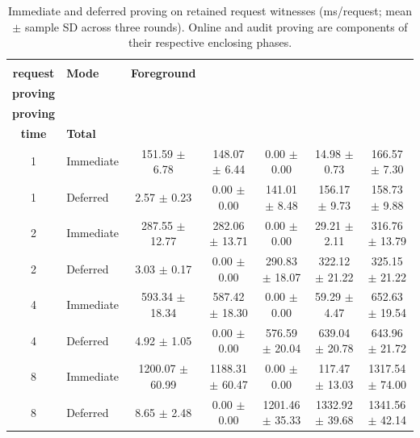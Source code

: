 \begin{table}[!t]
\centering
\caption{Immediate and deferred proving on retained request witnesses (ms/request; mean $\pm$ sample SD across three rounds). Online and audit proving are components of their respective enclosing phases.}
\label{tab:c2-deferred-cost}
\footnotesize
\renewcommand{\arraystretch}{1.08}
\begin{tabular*}{\textwidth}{@{\hspace{3pt}}c@{\extracolsep{\fill}}lccccc@{\hspace{3pt}}}
\toprule
\shortstack{\textbf{Calls/}\\\textbf{request}} & \textbf{Mode} & \textbf{Foreground} & \shortstack{\textbf{Online}\\\textbf{proving}} & \shortstack{\textbf{Audit}\\\textbf{proving}} & \shortstack{\textbf{Audit}\\\textbf{time}} & \textbf{Total} \\
\midrule
1 & Immediate & 151.59 $\pm$ 6.78 & 148.07 $\pm$ 6.44 & 0.00 $\pm$ 0.00 & 14.98 $\pm$ 0.73 & 166.57 $\pm$ 7.30 \\
1 & Deferred & 2.57 $\pm$ 0.23 & 0.00 $\pm$ 0.00 & 141.01 $\pm$ 8.48 & 156.17 $\pm$ 9.73 & 158.73 $\pm$ 9.88 \\
2 & Immediate & 287.55 $\pm$ 12.77 & 282.06 $\pm$ 13.71 & 0.00 $\pm$ 0.00 & 29.21 $\pm$ 2.11 & 316.76 $\pm$ 13.79 \\
2 & Deferred & 3.03 $\pm$ 0.17 & 0.00 $\pm$ 0.00 & 290.83 $\pm$ 18.07 & 322.12 $\pm$ 21.22 & 325.15 $\pm$ 21.22 \\
4 & Immediate & 593.34 $\pm$ 18.34 & 587.42 $\pm$ 18.30 & 0.00 $\pm$ 0.00 & 59.29 $\pm$ 4.47 & 652.63 $\pm$ 19.54 \\
4 & Deferred & 4.92 $\pm$ 1.05 & 0.00 $\pm$ 0.00 & 576.59 $\pm$ 20.04 & 639.04 $\pm$ 20.78 & 643.96 $\pm$ 21.72 \\
\rowcolor{gray!12}
8 & Immediate & 1200.07 $\pm$ 60.99 & 1188.31 $\pm$ 60.47 & 0.00 $\pm$ 0.00 & 117.47 $\pm$ 13.03 & 1317.54 $\pm$ 74.00 \\
\rowcolor{gray!12}
8 & Deferred & 8.65 $\pm$ 2.48 & 0.00 $\pm$ 0.00 & 1201.46 $\pm$ 35.33 & 1332.92 $\pm$ 39.68 & 1341.56 $\pm$ 42.14 \\
\bottomrule
\end{tabular*}
\end{table}

